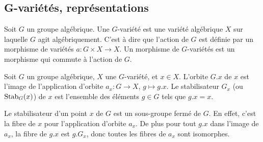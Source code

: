 \subsection{G-variétés, représentations}

\begin{defn}[$G$-variété]
Soit $G$ un groupe algébrique. Une $G$-variété est une variété algébrique $X$ sur laquelle $G$ agit algébriquement. C'est à dire que l'action de $G$ est définie par un morphisme de variétés $a:G\times X\rightarrow X$. Un morphisme de $G$-variétés est un morphisme qui commute à l'action de $G$. 
\end{defn}

\begin{defn}
Soit $G$ un groupe algébrique, $X$ une $G$-variété, et $x\in X$. L'orbite $G.x$ de $x$ est l'image de l'application d'orbite $a_x:G\rightarrow X$, $g\mapsto g.x$. Le stabilisateur $G_x$ (ou $\operatorname{Stab}_G(x)$) de $x$ est l'ensemble des éléments $g\in G$ tels que $g.x=x$.  
\end{defn}

Le stabilisateur d'un point $x$ de $G$ est un sous-groupe fermé de $G$. En effet, c'est la fibre de $x$ pour l'application d'orbite $a_x$. De plus pour tout $g.x$ dans l'image de $a_x$, la fibre de $g.x$ est $g.G_x$, donc toutes les fibres de $a_x$ sont isomorphes.

